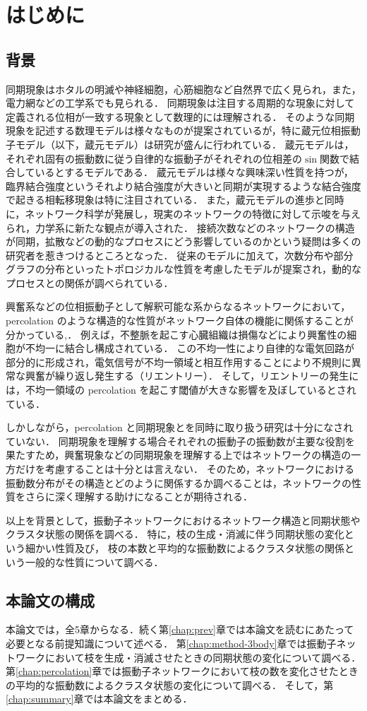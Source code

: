 \documentclass[../main]{subfiles}
\begin{document}
\chapter{はじめに}
\section{背景}
\label{chap:intro-back}
同期現象はホタルの明滅や神経細胞，心筋細胞など自然界で広く見られ，また，電力網などの工学系でも見られる．
同期現象は注目する周期的な現象に対して定義される位相が一致する現象として数理的には理解される．
そのような同期現象を記述する数理モデルは様々なものが提案されているが，特に蔵元位相振動子モデル（以下，蔵元モデル）は研究が盛んに行われている．
蔵元モデルは，それぞれ固有の振動数に従う自律的な振動子がそれぞれの位相差の$\sin$関数で結合しているとするモデルである．
蔵元モデルは様々な興味深い性質を持つが，臨界結合強度というそれより結合強度が大きいと同期が実現するような結合強度で起きる相転移現象は特に注目されている．
また，蔵元モデルの進歩と同時に，ネットワーク科学が発展し，現実のネットワークの特徴に対して示唆を与えられ，力学系に新たな観点が導入された\cite{RODRIGUES20161}．
接続次数などのネットワークの構造が同期，拡散などの動的なプロセスにどう影響しているのかという疑問は多くの研究者を惹きつけるところとなった．
従来のモデルに加えて，次数分布や部分グラフの分布といったトポロジカルな性質を考慮したモデルが提案され，動的なプロセスとの関係が調べられている．

興奮系などの位相振動子として解釈可能な系からなるネットワークにおいて，percolation のような構造的な性質がネットワーク自体の機能に関係することが分かっている\cite{PhysRevLett.110.158101},\cite{Pasquale2008SelforganizationAN}．
例えば，不整脈を起こす心臓組織は損傷などにより興奮性の細胞が不均一に結合し構成されている．
この不均一性により自律的な電気回路が部分的に形成され，電気信号が不均一領域と相互作用することにより不規則に異常な興奮が繰り返し発生する（リエントリー）．
そして，リエントリーの発生には，不均一領域の percolation を起こす閾値が大きな影響を及ぼしているとされている\cite{PhysRevLett.110.158101}．

しかしながら，percolation と同期現象とを同時に取り扱う研究は十分になされていない．
同期現象を理解する場合それぞれの振動子の振動数が主要な役割を果たすため，興奮現象などの同期現象を理解する上ではネットワークの構造の一方だけを考慮することは十分とは言えない．
そのため，ネットワークにおける振動数分布がその構造とどのように関係するか調べることは，ネットワークの性質をさらに深く理解する助けになることが期待される．

以上を背景として，振動子ネットワークにおけるネットワーク構造と同期状態やクラスタ状態の関係を調べる．
特に，枝の生成・消滅に伴う同期状態の変化という細かい性質及び，
枝の本数と平均的な振動数によるクラスタ状態の関係という一般的な性質について調べる．
\section{本論文の構成}
\label{chap:intro-config}
本論文では，全5章からなる．続く第\ref{chap:prev}章では本論文を読むにあたって必要となる前提知識について述べる．
第\ref{chap:method-3body}章では振動子ネットワークにおいて枝を生成・消滅させたときの同期状態の変化について調べる．
第\ref{chap:percolation}章では振動子ネットワークにおいて枝の数を変化させたときの平均的な振動数によるクラスタ状態の変化について調べる．
そして，第\ref{chap:summary}章では本論文をまとめる．
\end{document}
